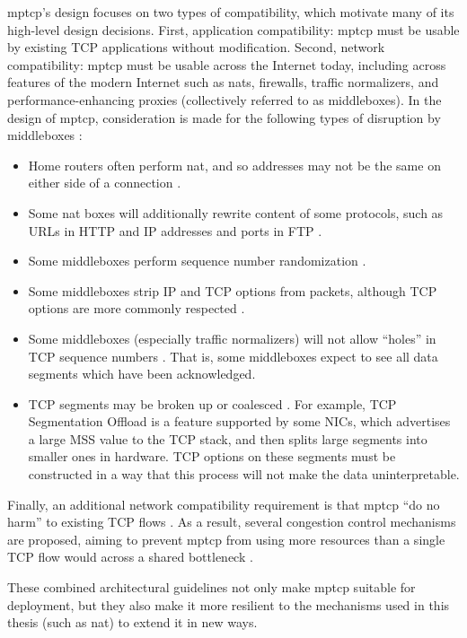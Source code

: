 \documentclass{cwru}
\begin{document}
\ac{mptcp}'s design focuses on two types of compatibility, which motivate many
of its high-level design decisions. First, application compatibility: \ac{mptcp}
must be usable by existing TCP applications without modification. Second,
network compatibility: \ac{mptcp} must be usable across the Internet today,
including across features of the modern Internet such as \acp{nat}, firewalls,
traffic normalizers, and performance-enhancing proxies (collectively referred to
as middleboxes). In the design of \ac{mptcp}, consideration is made for the
following types of disruption by middleboxes \cite{rfc6182}:

\begin{itemize}
\item Home routers often perform \ac{nat}, and so addresses may not be the same
  on either side of a connection \cite{rfc3022}.
\item Some \ac{nat} boxes will additionally rewrite content of some protocols,
  such as URLs in HTTP \cite{rfc6182} and IP addresses and ports in FTP
  \cite{raiciu2012hard}.
\item Some middleboxes perform sequence number randomization
  \cite{hesmans2013tcp,medina2005measuring}.
\item Some middleboxes strip IP and TCP options from packets, although TCP
  options are more commonly respected \cite{medina2005measuring}.
\item Some middleboxes (especially traffic normalizers) will not allow ``holes''
  in TCP sequence numbers \cite{hesmans2013tcp}. That is, some middleboxes
  expect to see all data segments which have been acknowledged.
\item TCP segments may be broken up or coalesced \cite{hesmans2013tcp}. For
  example, TCP Segmentation Offload is a feature supported by some NICs, which
  advertises a large MSS value to the TCP stack, and then splits large segments
  into smaller ones in hardware. TCP options on these segments must be
  constructed in a way that this process will not make the data uninterpretable.
\end{itemize}

Finally, an additional network compatibility requirement is that \acl{mptcp}
``do no harm'' to existing TCP flows \cite{rfc6182}. As a result, several
congestion control mechanisms are proposed, aiming to prevent \ac{mptcp} from
using more resources than a single TCP flow would across a shared bottleneck
\cite{rfc6356,draft-olia,draft-balia,draft-wvegas}.

These combined architectural guidelines not only make \ac{mptcp} suitable for
deployment, but they also make it more resilient to the mechanisms used in this
thesis (such as \ac{nat}) to extend it in new ways.
\end{document}
